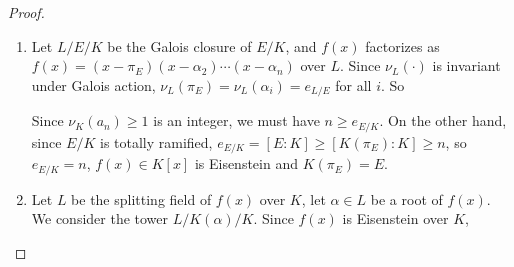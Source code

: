 \documentclass[11pt]{amsart}
\begin{document}
\begin{proof}~
    \begin{enumerate}
        \item Let $L/E/K$ be the Galois closure of $E/K$, and $f(x)$ factorizes as
            $f(x) = (x - \pi_E) (x - \alpha_2) \cdots (x - \alpha_n)$ over $L$.
            Since $\nu_L(\cdot)$ is invariant under Galois action, $\nu_L(\pi_E)
            = \nu_L(\alpha_i) = e_{L/E}$ for all $i$.  So
            \begin{figure}[htpb]
            \begin{center}
            \quad
            \end{center}
            \end{figure}

            Since $\nu_K(a_n) \geq 1$ is an integer, we must have $n \geq
            e_{E/K}$.  On the other hand, since $E/K$ is totally ramified,
            $e_{E/K} = [E : K] \geq [K(\pi_E) : K] \geq n$, so $e_{E/K} = n$,
            $f(x) \in K[x]$ is Eisenstein and $K(\pi_E) = E$.

        \item Let $L$ be the splitting field of $f(x)$ over $K$, let $\alpha \in
            L$ be a root of $f(x)$.  We consider the tower $L/K(\alpha)/K$.
            Since $f(x)$ is Eisenstein over $K$,


\end{enumerate}
\end{proof}
\end{document}
